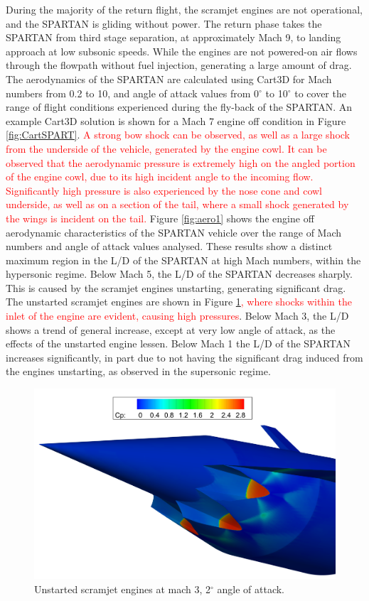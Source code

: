 During the majority of the return flight, the scramjet engines are not operational, and the SPARTAN is gliding without power. The return phase takes the SPARTAN from third stage separation, at approximately Mach 9, to landing approach at low subsonic speeds. 
 While the engines are not powered-on air flows through the flowpath without fuel injection, generating a large amount of drag. 
The aerodynamics of the SPARTAN are calculated using Cart3D for Mach numbers from 0.2 to 10, and angle of attack values from 0$^\circ$ to 10$^\circ$ to cover the range of flight conditions experienced during the fly-back of the SPARTAN.  An example Cart3D solution is shown for a Mach 7 engine off condition in Figure  \ref{fig:CartSPART}. \textcolor{red}{A strong bow shock can be observed, as well as a large shock from the underside of the vehicle, generated by the engine cowl. It can be observed that the aerodynamic pressure is extremely high on the angled portion of the engine cowl, due to its high incident angle to the incoming flow. Significantly high pressure is also experienced by the nose cone and cowl underside, as well as on a section of the tail, where a small shock generated by the wings is incident on the tail.}
Figure \ref{fig:aero1} shows the engine off aerodynamic characteristics of the SPARTAN vehicle over the range of Mach numbers and angle of attack values analysed.
These results show a distinct maximum region in the L/D of the SPARTAN at high Mach numbers, within the hypersonic regime. Below Mach 5, the L/D of the SPARTAN decreases sharply. This is caused by the scramjet engines unstarting, generating significant drag. The unstarted scramjet engines are shown in Figure \ref{fig:Unstart}\textcolor{red}{, where shocks within the inlet of the engine are evident, causing high pressures}. Below Mach 3,  the L/D shows a trend of general increase, except at very low angle of attack, as the effects of the unstarted engine lessen. Below Mach 1 the L/D of the SPARTAN increases significantly, in part due to not having the significant drag induced from the engines unstarting, as observed in the supersonic regime.  

\begin{figure}[ht]
	\centering
	\includegraphics[width=0.7\linewidth]{figures/3_vehicle_design/Unstart}
	\caption{Unstarted scramjet engines at mach 3, 2$^\circ$ angle of attack.}
	\label{fig:Unstart}
\end{figure}


